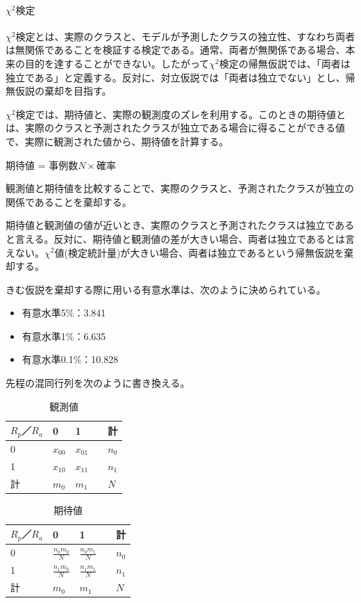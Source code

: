 \documentclass[dvipdfmx]{jsarticle}
\begin{document}
\paragraph{$χ^{2}検定$} \par
$χ^{2}検定$とは、実際のクラスと、モデルが予測したクラスの独立性、すなわち両者は無関係であることを検証する検定である。通常、両者が無関係である場合、本来の目的を達することができない。したがって$χ^{2}検定$の帰無仮説では、「両者は独立である」と定義する。反対に、対立仮説では「両者は独立でない」とし、帰無仮説の棄却を目指す。\par
$χ^{2}検定$では、期待値と、実際の観測度のズレを利用する。このときの期待値とは、実際のクラスと予測されたクラスが独立である場合に得ることができる値で、実際に観測された値から、期待値を計算する。
\begin{center}
  期待値 = 事例数$N\times$確率
\end{center}
観測値と期待値を比較することで、実際のクラスと、予測されたクラスが独立の関係であることを棄却する。\par
期待値と観測値の値が近いとき、実際のクラスと予測されたクラスは独立であると言える。反対に、期待値と観測値の差が大きい場合、両者は独立であるとは言えない。$χ^{2}値$(検定統計量)が大きい場合、両者は独立であるという帰無仮説を棄却する。\par
きむ仮説を棄却する際に用いる有意水準は、次のように決められている。
\begin{itemize}
  \item 有意水準5\%：3.841
  \item 有意水準1\%：6.635
  \item 有意水準0.1\%：10.828
\end{itemize}
先程の混同行列を次のように書き換える。
\begin{table}[H]
  \begin{center}
    \caption{観測値}
    \begin{tabular}{|l|l|l|l|} \hline
      $R_{p}$／$R_{a}$ & 0 & 1 & 計 \\ \hline
      0 & $x_{00}$ & $x_{01}$　& $n_{0}$\\ \hline
      1　& $x_{10}$ & $x_{11}$ & $n_{1}$\\ \hline
      計 & $m_{0}$ & $m_{1}$ & $N$ \\\hline
    \end{tabular}
    \label{hyo03}
  \end{center}
\end{table}
\begin{table}[H]
  \begin{center}
    \caption{期待値}
    \begin{tabular}{|l|l|l|l|} \hline
      $R_{p}$／$R_{a}$ & 0 & 1 & 計 \\ \hline
      0 & $\frac{n_{0}m_{0}}{N}$ & $\frac{n_{0}m_{1}}{N}$　& $n_{0}$\\ \hline
      1　& $\frac{n_{1}m_{0}}{N}$ & $\frac{n_{1}m_{1}}{N}$ & $n_{1}$\\ \hline
      計 & $m_{0}$ & $m_{1}$ & $N$ \\\hline
    \end{tabular}
    \label{hyo03}
  \end{center}
\end{table}
\end{document}
